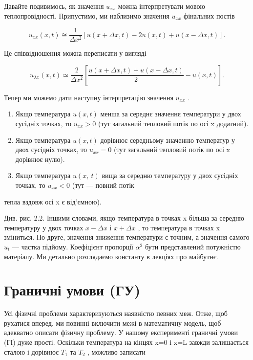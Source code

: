 \documentclass[
  ukrainian,
]{article}
\begin{document}
Давайте подивимось, як значення \(u_{xx}\) можна інтерпретувати мовою
теплопровідності. Припустимо, ми наблизимо значення \(u_{xx}\) фінальних
постів

\[
u_{xx}(x, t) \cong \frac{1}{\Delta x^2} [u(x + \Delta x, t) - 2u(x, t) + u(x - \Delta x, t)].
\]

Це співвідношення можна переписати у вигляді

\[
u_{\lambda x}(x, t) \simeq \frac{2}{\Delta x^2} \left[ \frac{u(x + \Delta x, t) + u(x - \Delta x, t)}{2} - u(x, t) \right].
\]

Тепер ми можемо дати наступну інтерпретацію значення \(u_{xx}\) .

\begin{enumerate}
\def\labelenumi{\arabic{enumi}.}
\item
  Якщо температура \(u(x, t)\) менша за середнє значення температури у
  двох сусідніх точках, то \(u_{xx} > 0\) (тут загальний тепловий потік
  по осі x додатний).
\item
  Якщо температура \(u(x, t)\) дорівнює середньому значенню температур у
  двох сусідніх точках, то \(u_{xx} = 0\) (тут загальний тепловий потік
  по осі x дорівнює нулю).
\item
  Якщо температура \(u\left(x,\ t\right)\) вища за середню температуру у
  двох сусідніх точках, то \(u_{xx}<0\) (тут --- повний потік
\end{enumerate}

тепла вздовж осі x є від'ємною).

Див. рис. 2.2. Іншими словами, якщо температура в точках x більша за
середню температуру у двох точках \(x - \Delta x\) і \(x + \Delta x\) ,
то температура в точках x зміниться. По-друге, значення зниження
температури є точним, а значення самого \(u_t\) --- частка підйому.
Коефіцієнт пропорції \(\alpha^2\) бути представлений потужністю
матеріалу. Ми детально розглядаємо константу в лекціях про майбутнє.

\section{Граничні умови
(ГУ)}\label{ux433ux440ux430ux43dux438ux447ux43dux456-ux443ux43cux43eux432ux438-ux433ux443}

Усі фізичні проблеми характеризуються наявністю певних меж. Отже, щоб
рухатися вперед, ми повинні включити межі в математичну модель, щоб
адекватно описати фізичну проблему. У нашому експерименті граничні умови
(ГІ) дуже прості. Оскільки температура на кінцях x=0 і x=L завжди
залишається сталою і дорівнює \(T_1\) та \(T_2\) , можливо записати
\end{document}

